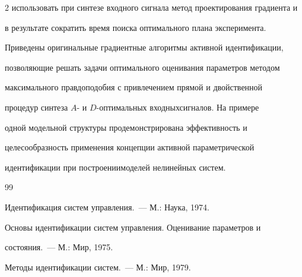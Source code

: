 \begin{multicols}{2}
использовать при синтезе входного сигнала метод проектирования градиента и


в результате сократить время поиска оптимального плана эксперимента.


Приведены оригинальные градиентные алгоритмы активной идентификации,


позволяющие решать задачи оптимального оценивания параметров методом


максимального правдоподобия с привлечением прямой и двойственной


процедур синтеза $A$- и $D$-оп\-ти\-маль\-ных входных\linebreak сигналов. На примере


одной модельной струк\-ту\-ры продемонстрирована эффективность и


це\-ле\-со\-образ\-ность применения концепции активной па\-ра\-мет\-ри\-че\-ской


идентификации при построении\linebreak моделей нелинейных систем.





{\small\frenchspacing


{%




\begin{thebibliography}{99}









Идентификация систем управления.~--- М.: Наука, 1974.









Основы идентификации систем управ\-ле\-ния. Оценивание параметров и


состояния.~--- М.: Мир, 1975.







 Методы идентификации систем.~--- М.: Мир, 1979.










\end{thebibliography}}}
\end{multicols}
